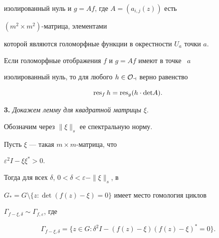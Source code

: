 изолированный нуль и $g=A f$, где $A=(a_{i,j}(z))$ есть 


$(m^2\times m^2)$-матрица, элементами 


которой являются голоморфные функции в окрестности $U_a$ точки $a$. 


 


\begin{thm} 


Если голоморфные отображения $f$ и $g=A f$ имеют в точке \ $a$ \ 


изолированный нуль, то для любого $h\in\cal O_a$ верно равенство 


$$ 


\res\nolimits_f h=\res\nolimits_g(h\cdot\det A). 


$$ 


\end{thm} 


 


{\bf 3.} {\it Докажем лемму для квадратной матрицы $\xi$}.


Обозначим через $\|\xi\|_s$ ее спектральную норму. 


 


\begin{lemnonum} 


Пусть $\xi$ --- такая $m\times m$-матрица, что 


$\varepsilon^2I-\xi\xi^*>0$. 


Тогда для всех $\delta$, $0<\delta<\varepsilon-\|\xi\|_s$, в 


$G_*=G\setminus\{z:\det(f(z)-\xi)=0\}$ имеет место гомология циклов 


$\Gamma_{f-\xi,\delta}\sim\Gamma_{f,\varepsilon}$, где 


$$ 


\Gamma_{f-\xi,\delta}=\{z\in G:\delta^2I-(f(z)-\xi) 


(f(z)-\xi)^*=0\}. 


$$ 


\end{lemnonum} 


 


